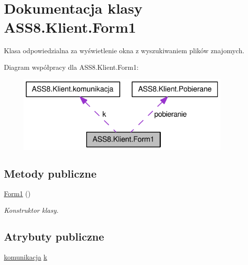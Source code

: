 \hypertarget{a00003}{
\section{Dokumentacja klasy ASS8.Klient.Form1}
\label{d1/d7c/a00003}
}
Klasa odpowiedzialna za wyświetlenie okna z wyszukiwaniem plików znajomych.  


Diagram współpracy dla ASS8.Klient.Form1:\nopagebreak
\begin{figure}[H]
\begin{center}
\leavevmode
\includegraphics[width=304pt]{dc/d9a/a00218}
\end{center}
\end{figure}
\subsection*{Metody publiczne}
\begin{CompactItemize}
\item 
\hyperlink{a00003_f4f57fa006228bda67e1478113bbd3bd}{Form1} ()
\begin{CompactList}\small\item\em Konstruktor klasy. \item\end{CompactList}\end{CompactItemize}
\subsection*{Atrybuty publiczne}
\begin{CompactItemize}
\item 
\hyperlink{a00013}{komunikacja} \hyperlink{a00003_3a7a9649738431ac4b2dd14fdabb7d1c}{k}
\end{CompactItemize}
